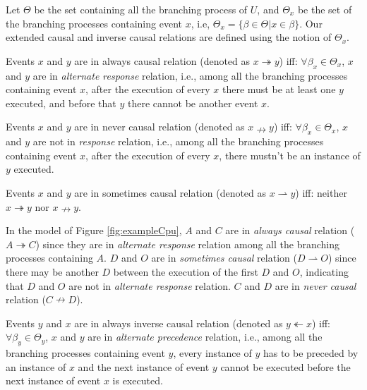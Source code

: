 \documentclass{llncs}
\begin{document}
Let $\Theta$ be the set containing all the branching process of $U$, and $\Theta_{x}$ be the set of the branching processes containing event $x$, i.e, $\Theta_{x}=\{\beta\in\Theta|x\in\beta\}$. Our extended causal and inverse causal relations are defined using the notion of $\Theta_{x}$.

\begin{definition}\label{def:alwaysCausal}
Events $x$ and $y$ are in always causal relation (denoted as $x\twoheadrightarrow y$) iff: $\forall\beta_{x}\in\Theta_{x}$, $x$ and $y$ are in \textit{alternate response} relation, i.e., among all the branching processes containing event $x$, after the execution of every $x$ there must be at least one $y$ executed, and before that $y$ there cannot be another event $x$.
\end{definition}

\begin{definition}\label{def:neverCausal}
Events $x$ and $y$ are in never causal relation (denoted as $x\nrightarrow y$) iff: $\forall\beta_{x}\in\Theta_{x}$, $x$ and $y$ are not in \textit{response} relation, i.e., among all the branching processes containing event $x$, after the execution of every $x$, there mustn't be an instance of $y$ executed.
\end{definition}

\begin{definition}\label{def:sometimesCausal}
Events $x$ and $y$ are in sometimes causal relation (denoted as $x\rightharpoonup y$) iff: neither $x\twoheadrightarrow y$ nor $x\nrightarrow y$.
\end{definition}

\begin{example}\label{ex:causalRelation}
In the model of Figure \ref{fig:exampleCpu}, $A$ and $C$ are in \textit{always causal} relation ($A\twoheadrightarrow C$) since they are in \textit{alternate response} relation among all the branching processes containing $A$. $D$ and $O$ are in \textit{sometimes causal} relation ($D\rightharpoonup O$) since there may be another $D$ between the execution of the first $D$ and $O$, indicating that $D$ and $O$ are not in \textit{alternate response} relation. $C$ and $D$ are in \textit{never causal} relation ($C\nrightarrow D$).
\end{example}

\begin{definition}\label{def:alwaysInverseCausal}
Events $y$ and $x$ are in always inverse causal relation (denoted as $y\twoheadleftarrow x$) iff: $\forall\beta_{y}\in\Theta_{y}$, $x$ and $y$ are in \textit{alternate precedence} relation, i.e., among all the branching processes containing event $y$, every instance of $y$ has to be preceded by an instance of $x$ and the next instance of event $y$ cannot be executed before the next instance of event $x$ is executed.
\end{definition}
\end{document}
